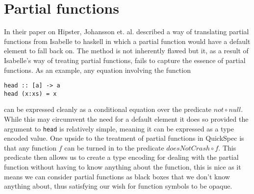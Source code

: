 \section{Partial functions}
In their paper on Hipster, Johansson et. al. \cite{Johansson2014}
described a way of translating partial functions from
Isabelle to haskell in which a partial function would
have a default element to fall back on. The method is
not inherently flawed but it, as a result of Isabelle's
way of treating partial functions,
fails to capture the essence of partial functions.
As an example, any equation involving the function
\begin{verbatim}head :: [a] -> a
head (x:xs) = x
\end{verbatim}
can be expressed cleanly as a conditional equation
over the predicate $not\circ null$.
While this may circumvent the need for
a default element it does so provided the
argument to \texttt{head} is relatively simple,
meaning it can be expressed as a type encoded value.
One upside to the treatment of partial functions in QuickSpec
is that any function $f$ can be turned in to the predicate
$doesNotCrash \circ f$. This predicate then allows us to create
a type encoding for dealing with the partial function without
having to know anything about the function, this is nice as it means
we can consider partial functions as black boxes that we don't know
anything about, thus satisfying our wish for function symbols to be opaque.
